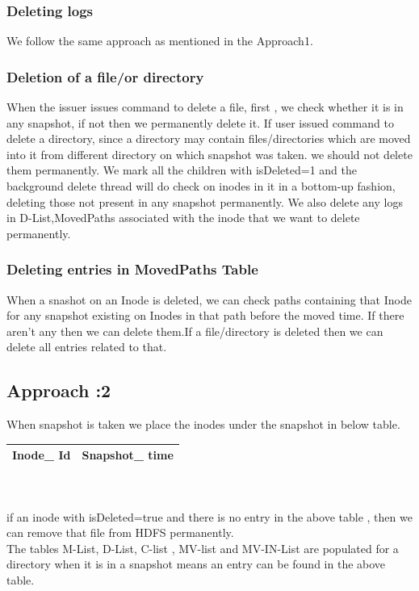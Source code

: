\subsubsection{Deleting logs}
 We follow the same approach as mentioned in the Approach1.

\subsubsection{Deletion of a file/or directory}
When the issuer issues command to delete a file, first , we check whether it is in any snapshot, if not then we permanently delete it. If user issued command to delete a directory, since a directory may contain files/directories which are moved into it from different directory on which snapshot was taken. we should not delete them permanently. We mark all the children with isDeleted=1 and the background delete thread will do check on inodes in it in a bottom-up fashion, deleting those not present in any snapshot permanently.
 We also delete any logs in  D-List,MovedPaths associated with the inode that we want to delete permanently.

\subsubsection{Deleting entries in MovedPaths Table}
When a snashot on an Inode is deleted, we can check paths containing that Inode for any snapshot existing on Inodes in that path before the moved time. If there aren’t any then we can delete them.If a file/directory is deleted then we can delete all entries related to that. 

\subsection{Approach :2}
When snapshot is taken we place the inodes under the snapshot in below table.

\begin{tabular}{|c|c|}
\hline
Inode\_ Id&Snapshot\_ time\\
\hline
\end{tabular}\\\\
if an inode with isDeleted=true and there is no entry in the above table , then we can remove that file from HDFS permanently.\\
The tables M-List, D-List, C-list , MV-list and MV-IN-List are populated for a directory when it is in a snapshot means an entry can be found in the above table.
